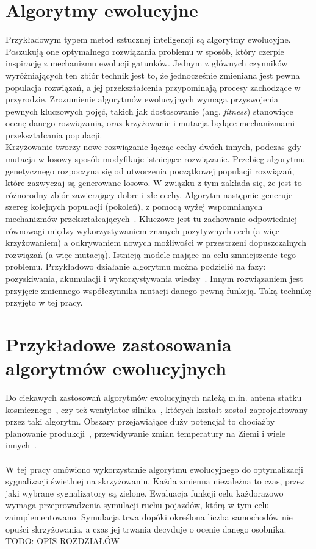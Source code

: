 \section*{Algorytmy ewolucyjne} Przykładowym typem metod sztucznej inteligencji są algorytmy ewolucyjne. Poszukują one optymalnego rozwiązania problemu w sposób, który czerpie inspirację z mechanizmu ewolucji gatunków. Jednym z głównych czynników wyróżniających ten zbiór technik jest to, że jednocześnie zmieniana jest pewna populacja rozwiązań, a jej przekształcenia przypominają procesy zachodzące w przyrodzie. Zrozumienie algorytmów ewolucyjnych wymaga przyswojenia pewnych kluczowych pojęć, takich jak dostosowanie (ang. \textit{fitness}) stanowiące ocenę danego rozwiązania, oraz krzyżowanie i mutacja będące mechanizmami przekształcania populacji. \\Krzyżowanie tworzy nowe rozwiązanie łącząc cechy dwóch innych, podczas gdy mutacja w losowy sposób modyfikuje istniejące rozwiązanie. 
Przebieg algorytmu genetycznego rozpoczyna się od utworzenia początkowej populacji rozwiązań, które zazwyczaj są generowane losowo. W związku z tym zakłada się, że jest to różnorodny zbiór zawierający dobre i złe cechy.
Algorytm następnie generuje szereg kolejnych populacji (pokoleń), z pomocą wyżej wspomnianych mechanizmów przekształcających~\cite{Cohoon:2003:EAP:903758.903786}. Kluczowe jest tu zachowanie odpowiedniej równowagi między wykorzystywaniem znanych pozytywnych cech (a więc krzyżowaniem) a odkrywaniem nowych możliwości w przestrzeni dopuszczalnych rozwiązań (a więc mutacją). Istnieją modele mające na celu zmniejszenie tego problemu. Przykładowo działanie algorytmu można podzielić na fazy: pozyskiwania, akumulacji i wykorzystywania wiedzy~\cite{10.1371/journal.pone.0095693}. Innym rozwiązaniem jest przyjęcie zmiennego współczynnika mutacji danego pewną funkcją. Taką technikę przyjęto w tej pracy. 
\section*{Przykładowe zastosowania algorytmów ewolucyjnych} Do ciekawych zastosowań algorytmów ewolucyjnych należą m.in. antena statku kosmicznego~\cite{Lohn2006AutomatedAD}, czy też wentylator silnika~\cite{article}, których kształt został zaprojektowany przez taki algorytm. Obszary przejawiające duży potencjał to chociażby planowanie produkcji~\cite{Wall:1996:GAR:925320}, przewidywanie zmian temperatury na Ziemi\cite{Stanislawska:2012:MGT:2400749.2401077} i wiele innych~\cite{Steinbuch2010}.
\paragraph{}W tej pracy omówiono wykorzystanie algorytmu ewolucyjnego do optymalizacji sygnalizacji świetlnej na skrzyżowaniu. Każda zmienna niezależna to czas, przez jaki wybrane sygnalizatory są zielone. Ewaluacja funkcji celu każdorazowo wymaga przeprowadzenia symulacji ruchu pojazdów, którą w tym celu zaimplementowano. Symulacja trwa dopóki określona liczba samochodów nie opuści skrzyżowania, a czas jej trwania decyduje o ocenie danego osobnika. \\
{\Huge TODO: OPIS ROZDZIAŁÓW}
